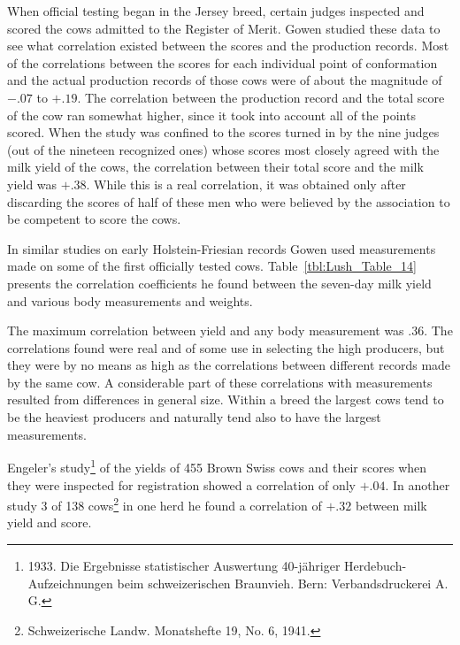 When official testing began in the Jersey breed, certain judges
inspected and scored the cows admitted to the Register of Merit.
Gowen studied these data to see what correlation existed between the
scores and the production records. Most of the correlations between the
scores for each individual point of conformation and the actual production
records of those cows were of about the magnitude of $- .07$ to $+ .19$.
The correlation between the production record and the total
score of the cow ran somewhat higher, since it took into account all of
the points scored. When the study was confined to the scores turned in
by the nine judges (out of the nineteen recognized ones) whose scores
most closely agreed with the milk yield of the cows, the correlation
between their total score and the milk yield was $+ .38$. While this is a
real correlation, it was obtained only after discarding the scores of half
of these men who were believed by the association to be competent to
score the cows.

In similar studies on early Holstein-Friesian records Gowen used
measurements made on some of the first officially tested cows.
Table~\ref{tbl:Lush_Table_14} presents the correlation coefficients
he found between the seven-day milk yield and various body measurements
and weights.

The maximum correlation between yield and any body measurement
was .36. The correlations found were real and of some use in
selecting the high producers, but they were by no means as high as the
correlations between different records made by the same cow. A considerable
part of these correlations with measurements resulted from differences
in general size. Within a breed the largest cows tend to be the
heaviest producers and naturally tend also to have the largest measurements.

Engeler's study\footnote{1933. Die Ergebnisse statistischer Auswertung
40-j\"ahriger Herdebuch-Aufzeichnungen beim schweizerischen Braunvieh.
Bern: Verbandsdruckerei A. G.} of the yields of 455 Brown Swiss cows and their
scores when they were inspected for registration showed a correlation
of only $+ .04$. In another study 3 of 138 cows\footnote{Schweizerische Landw.
Monatshefte 19, No. 6, 1941.} in one herd he found a correlation of $+ .32$
between milk yield and score.

